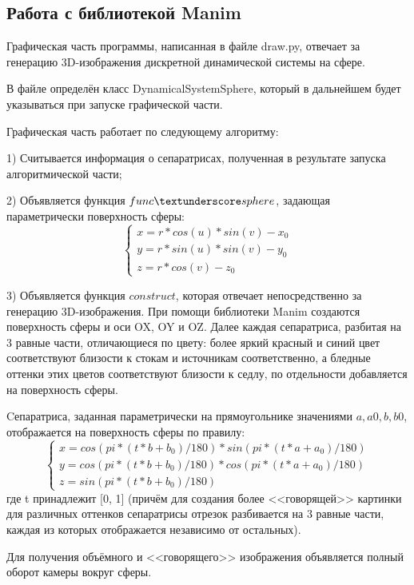 	\subsection{Работа с библиотекой Manim}
	\hspace{0.5 cm} Графическая часть программы, написанная в файле draw.py, отвечает за генерацию 3D-изображения дискретной динамической системы на сфере.
	\par В файле определён класс DynamicalSystemSphere, который в дальнейшем будет указываться при запуске графической части.
	\par Графическая часть работает по следующему алгоритму:
	\par 1) Считывается информация о сепаратрисах, полученная в результате запуска алгоритмической части;
	\par 2) Объявляется функция $func \textunderscore sphere$, задающая параметрически поверхность сферы:
	$$ \begin{cases}
		x = r * cos(u) * sin(v) - x_0\\
		y = r * sin(u) * sin(v) - y_0\\
		z = r * cos(v) - z_0
	\end{cases} $$
	\par 3) Объявляется функция $construct$, которая отвечает непосредственно за генерацию 3D-изображения. При помощи библиотеки Manim создаются поверхность сферы и оси OX, OY и OZ. Далее каждая сепаратриса, разбитая на 3 равные части, отличающиеся по цвету: более яркий красный и синий цвет соответствуют близости к стокам и источникам соответственно, а бледные оттенки этих цветов соответствуют близости к седлу, по отдельности добавляется на поверхность сферы.
	\par Cепаратриса, заданная параметрически на прямоугольнике значениями $a, a0, b, b0$, отображается на поверхность сферы по правилу:
	$$ \begin{cases}
		x = cos(pi * (t * b + b_0) / 180) * sin(pi * (t * a + a_0) / 180)\\
		y = cos(pi * (t * b + b_0) / 180) * cos(pi * (t * a + a_0) / 180)\\
		z = sin(pi * (t * b + b_0) / 180)
	\end{cases} $$ где t принадлежит [0, 1] (причём для создания более <<говорящей>> картинки для различных оттенков сепаратрисы отрезок разбивается на 3 равные части, каждая из которых отображается независимо от остальных).
	\par Для получения объёмного и <<говорящего>> изображения объявляется полный оборот камеры вокруг сферы.
